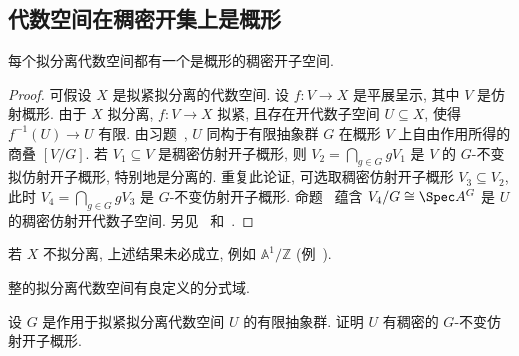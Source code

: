 \subsection{代数空间在稠密开集上是概形}\label{src:5.5.1-subsection}
\begin{theorem}\label{src:5.5.1}
每个拟分离代数空间都有一个是概形的稠密开子空间.
\end{theorem}
\begin{proof}
可假设 $X$ 是拟紧拟分离的代数空间. 设 $f:V\to X$ 是平展呈示, 其中 $V$ 是仿射概形. 由于 $X$ 拟分离, $f:V\to X$ 拟紧, 且存在开代数子空间 $U\subseteq X$, 使得 $f^{-1}(U)\to U$ 有限. 由习题~, $U$ 同构于有限抽象群 $G$ 在概形 $V$ 上自由作用所得的商叠 $[V/G]$. 若 $V_1\subseteq V$ 是稠密仿射开子概形, 则 $V_2=\bigcap_{g\in G}gV_1$ 是 $V$ 的 $G$-不变拟仿射开子概形, 特别地是分离的. 重复此论证, 可选取稠密仿射开子概形 $V_3\subseteq V_2$, 此时 $V_4=\bigcap_{g\in G}gV_3$ 是 $G$-不变仿射开子概形. 命题~ 蕴含 $V_4/G\cong\Spec A^G$ 是 $U$ 的稠密仿射开代数子空间. 另见~\cite[II.6.7]{Knu71} 和~\cite[Tag 06NN]{SP}.
\end{proof}
\begin{remark}\label{src:5.5.2}
若 $X$ 不拟分离, 上述结果未必成立, 例如 $\mathbb A^1/\mathbb Z$ (例~).
\end{remark}
\begin{corollary}\label{src:5.5.3}
整的拟分离代数空间有良定义的分式域.
\end{corollary}
\begin{exercise}\label{src:5.5.4}
设 $G$ 是作用于拟紧拟分离代数空间 $U$ 的有限抽象群. 证明 $U$ 有稠密的 $G$-不变仿射开子概形.
\end{exercise}

